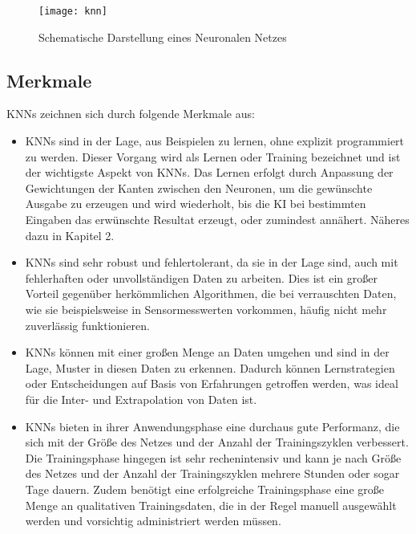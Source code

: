 \newpage


\begin{figure}[h]
    \centering
    \texttt{[image: knn]}
    \caption{Schematische Darstellung eines Neuronalen Netzes}
    \label{Abb:basic}
    \end{figure}

\subsection{Merkmale}

\noindent \acp{KNN} zeichnen sich durch folgende Merkmale aus:

\begin{itemize}
    \item \acp{KNN} sind in der Lage, aus Beispielen zu lernen, ohne explizit programmiert zu werden. Dieser Vorgang wird als Lernen oder Training bezeichnet und ist der wichtigste Aspekt von \acp{KNN}. Das Lernen erfolgt durch Anpassung der Gewichtungen der Kanten zwischen den Neuronen, um die gewünschte Ausgabe zu erzeugen und wird wiederholt, bis die \ac{KI} bei bestimmten Eingaben das erwünschte Resultat erzeugt, oder zumindest annähert. Näheres dazu in Kapitel 2.
    \item \acp{KNN} sind sehr robust und fehlertolerant, da sie in der Lage sind, auch mit fehlerhaften oder unvollständigen Daten zu arbeiten. Dies ist ein großer Vorteil gegenüber herkömmlichen Algorithmen, die bei verrauschten Daten, wie sie beispielsweise in Sensormesswerten vorkommen, häufig nicht mehr zuverlässig funktionieren.
    \item \acp{KNN} können mit einer großen Menge an Daten umgehen und sind in der Lage, Muster in diesen Daten zu erkennen. Dadurch können Lernstrategien oder Entscheidungen auf Basis von Erfahrungen getroffen werden, was ideal für die Inter- und Extrapolation von Daten ist.
    \item \acp{KNN} bieten in ihrer Anwendungsphase eine durchaus gute Performanz, die sich mit der Größe des Netzes und der Anzahl der Trainingszyklen verbessert. Die Trainingsphase hingegen ist sehr rechenintensiv und kann je nach Größe des Netzes und der Anzahl der Trainingszyklen mehrere Stunden oder sogar Tage dauern. Zudem benötigt eine erfolgreiche Trainingsphase eine große Menge an qualitativen Trainingsdaten, die in der Regel manuell ausgewählt werden und vorsichtig administriert werden müssen.
    \end{itemize}
    

\newpage